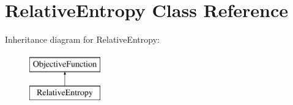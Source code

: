 \hypertarget{classRelativeEntropy}{\section{Relative\-Entropy Class Reference}
\label{classRelativeEntropy}
}
Inheritance diagram for Relative\-Entropy\-:\begin{figure}[H]
\begin{center}
\leavevmode
\includegraphics[height=2.000000cm]{classRelativeEntropy}
\end{center}
\end{figure}
